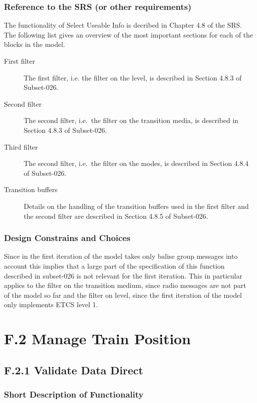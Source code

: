 \documentclass{template/openetcs_report}
\begin{document}
\subsubsection{Reference to the SRS (or other requirements)}
The functionality of Select Useable Info is decribed in Chapter 4.8 of the SRS. The following list gives an overview of the most important sections for each of the blocks in the model.

\begin{description}
\item[First filter] The first filter, i.e. the filter on the level, is described in Section 4.8.3 of Subset-026.
\item[Second filter] The second filter, i.e.~the filter on the transition media, is described in Section 4.8.3 of Subset-026.
\item[Third filter]
 The second filter, i.e.~the filter on the modes, is described in Section 4.8.4 of Subset-026.
\item[Transition buffers] Details on the handling of the transition buffers used in the first filter and the second filter are described in Section 4.8.5 of Subset-026.
\end{description}

\subsubsection{Design Constrains and Choices}
 Since in the first iteration of the model takes only balise group messages into account this implies that a large part of the specification of this function described in subset-026 is not relevant for the first iteration. This in particular applies to the filter on the transition medium, since radio messages are not part of the model so far and the filter on level, since the first iteration of the model only implements ETCS level 1.

\section{F.2 Manage Train Position}


\subsection{F.2.1 Validate Data Direct}

\subsubsection{Short Description of Functionality}
\end{document}
